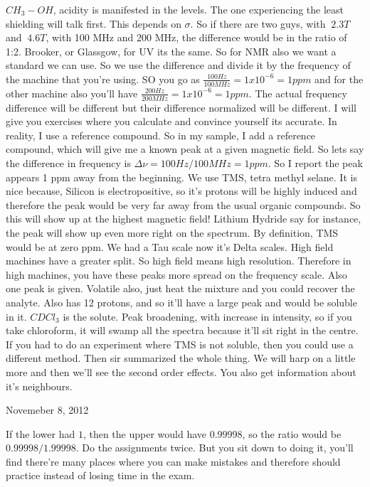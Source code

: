 		$CH_3-OH$, acidity is manifested in the levels. The one experiencing the least shielding will talk first. This depends on $\sigma$.
		So if there are two guys, with $~2.3T$ and $~4.6T$, with 100 MHz and 200 MHz, the difference would be in the ratio of 1:2. Brooker, or Glassgow, for UV its the same.
		So for NMR also we want a standard we can use. So we use the difference and divide it by the frequency of the machine that you're using. 
		SO you go as $\frac{100Hz}{100MHz}=1x10^{-6}=1ppm$ and for the other machine also you'll have $\frac{200Hz}{200MHz}=1x10^{-6}=1ppm$. The actual frequency difference will be different but their difference normalized will be different. I will give you exercises where you calculate and convince yourself its accurate. 
		In reality, I use a reference compound. So in my sample, I add a reference compound, which will give me a known peak at a given magnetic field. So lets say the difference in frequency is $\Delta \nu=100 Hz/100 MHz=1ppm$. So I report the peak appears 1 ppm away from the beginning. We use TMS, tetra methyl selane. It is nice because, Silicon is electropositive, so it's protons will be highly induced and therefore the peak would be very far away from the usual organic compounds. So this will show up at the highest magnetic field! Lithium Hydride say for instance, the peak will show up even more right on the spectrum. By definition, TMS would be at zero ppm. We had a Tau scale now it's Delta scales. High field machines have a greater split. So high field means high resolution. Therefore in high machines, you have these peaks more spread on the frequency scale.
		Also one peak is given. Volatile also, just heat the mixture and you could recover the analyte. Also has 12 protons, and so it'll have a large peak and would be soluble in it. $CDCl_3$ is the solute. Peak broadening, with increase in intensity, so if you take chloroform, it will swamp all the spectra because it'll sit right in the centre.
		If you had to do an experiment where TMS is not soluble, then you could use a different method.
		Then sir summarized the whole thing. We will harp on a little more and then we'll see the second order effects. You also get information about it's neighbours.
\begin{flushright}
Novemeber 8, 2012
\end{flushright}
		If the lower had $1$, then the upper would have $0.99998$, so the ratio would be $0.99998/1.99998$. Do the assignments twice. But you sit down to doing it, you'll find there're many places where you can make mistakes and therefore should practice instead of losing time in the exam.

